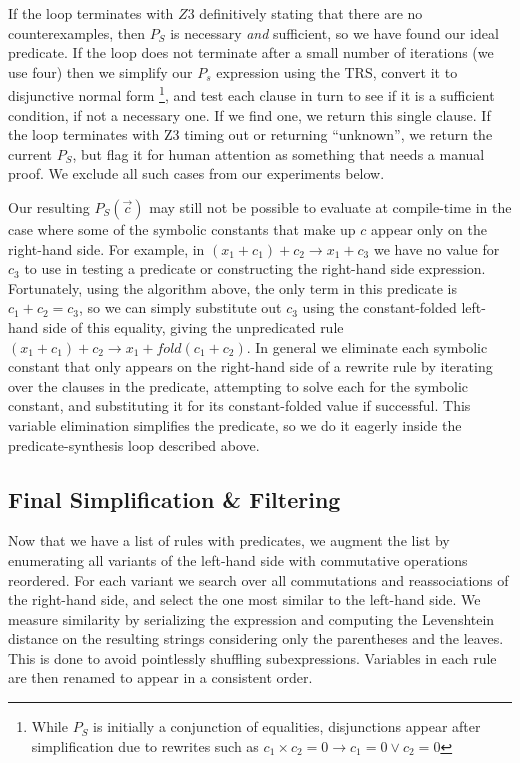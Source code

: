 \documentclass[acmsmall,review,anonymous]{acmart}\settopmatter{printfolios=true,printccs=false,printacmref=false}
\begin{document}
If the loop terminates with $Z3$ definitively stating that there are
no counterexamples, then $P_S$ is necessary \emph{and} sufficient, so
we have found our ideal predicate. If the loop does not terminate
after a small number of iterations (we use four) then we simplify our
$P_s$ expression using the TRS, convert it to disjunctive normal
form \footnote{While $P_S$ is initially a conjunction of equalities,
  disjunctions appear after simplification due to rewrites such as
  $c_1 \times c_2 = 0 \rightarrow c_1 = 0 \vee c_2 = 0$}, and test
each clause in turn to see if it is a sufficient condition, if not a
necessary one. If we find one, we return this single clause. If the
loop terminates with Z3 timing out or returning ``unknown'', we return
the current $P_S$, but flag it for human attention as something that
needs a manual proof. We exclude all such cases from our experiments
below.

Our resulting $P_S(\vec{c})$ may still not be possible to evaluate at
compile-time in the case where some of the symbolic constants that
make up $c$ appear only on the right-hand side. For example, in $(x_1
+ c_1) + c_2 \rightarrow x_1 + c_3$ we have no value for $c_3$ to use
in testing a predicate or constructing the right-hand side
expression. Fortunately, using the algorithm above, the only term in
this predicate is $c_1 + c_2 = c_3$, so we can simply substitute out
$c_3$ using the constant-folded left-hand side of this equality,
giving the unpredicated rule $(x_1 + c_1) + c_2 \rightarrow x_1 +
fold(c_1 + c_2)$. In general we eliminate each symbolic constant that
only appears on the right-hand side of a rewrite rule by iterating
over the clauses in the predicate, attempting to solve each for the
symbolic constant, and substituting it for its constant-folded value
if successful. This variable elimination simplifies the predicate, so
we do it eagerly inside the predicate-synthesis loop described above.

\subsection{Final Simplification \& Filtering}

Now that we have a list of rules with predicates, we augment the list
by enumerating all variants of the left-hand side with commutative
operations reordered. For each variant we search over all commutations
and reassociations of the right-hand side, and select the one most
similar to the left-hand side. We measure similarity by serializing
the expression and computing the Levenshtein distance on the resulting
strings considering only the parentheses and the leaves. This is done
to avoid pointlessly shuffling subexpressions. Variables in each rule
are then renamed to appear in a consistent order.
\end{document}
